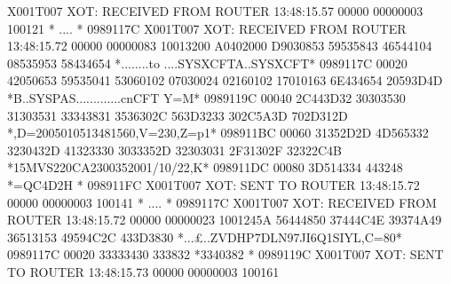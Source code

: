 \documentclass[letterpaper,10pt,english]{sphinxmanual}
\begin{document}
\begin{sphinxVerbatim}[commandchars=\\\{\}]
X001T007 XOT: RECEIVED FROM ROUTER                          13:48:15.57
00000 00000003 100121                                                         * ....                           * 0989117C
X001T007 XOT: RECEIVED FROM ROUTER                          13:48:15.72
00000 00000083 10013200 A0402000 D9030853 59535843 46544104 08535953 58434654 *........to ....SYSXCFTA..SYSXCFT* 0989117C
00020 42050653 59535041 53060102 07030024 02160102 17010163 6E434654 20593D4D *B..SYSPAS......\PYGZdl{}.......cnCFT Y=M* 0989119C
00040 2C443D32 30303530 31303531 33343831 3536302C 563D3233 302C5A3D 702D312D *,D=2005010513481560,V=230,Z=p\PYGZhy{}1\PYGZhy{}* 098911BC
00060 31352D2D 4D565332 3230432D 41323330 3033352D 32303031 2F31302F 32322C4B *15\PYGZhy{}\PYGZhy{}MVS220C\PYGZhy{}A230035\PYGZhy{}2001/10/22,K* 098911DC
00080 3D514334 443248                                                         *=QC4D2H                         * 098911FC
X001T007 XOT: SENT TO ROUTER                                13:48:15.72
00000 00000003 100141                                                         * ....                           * 0989117C
X001T007 XOT: RECEIVED FROM ROUTER 13:48:15.72
00000 00000023 1001245A 56444850 37444C4E 39374A49 36513153 49594C2C 433D3830 *...£..\PYGZdl{}ZVDHP7DLN97JI6Q1SIYL,C=80* 0989117C
00020 33333430 333832                                                         *3340382                         * 0989119C
X001T007 XOT: SENT TO ROUTER                                13:48:15.73
00000 00000003 100161
\end{sphinxVerbatim}

\sphinxAtStartPar
{}
\end{document}
